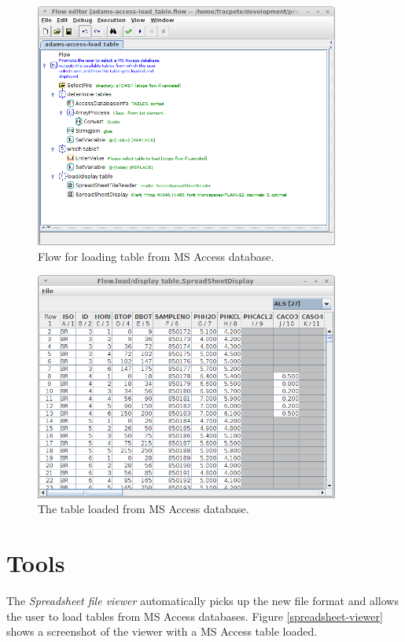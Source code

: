 \documentclass[a4paper]{book}
\begin{document}
\begin{figure}[htb]
  \centering
  \includegraphics[width=10.0cm]{images/spreadsheet-display-flow.png}
  \caption{Flow for loading table from MS Access database.}
  \label{spreadsheet-display-flow}
\end{figure}

\begin{figure}[htb]
  \centering
  \includegraphics[width=10.0cm]{images/spreadsheet-display-output.png}
  \caption{The table loaded from MS Access database.}
  \label{spreadsheet-display-output}
\end{figure}

\chapter{Tools}
The \textit{Spreadsheet file viewer} automatically picks up the new file format
and allows the user to load tables from MS Access databases. Figure \ref{spreadsheet-viewer}
shows a screenshot of the viewer with a MS Access table loaded.
\end{document}
